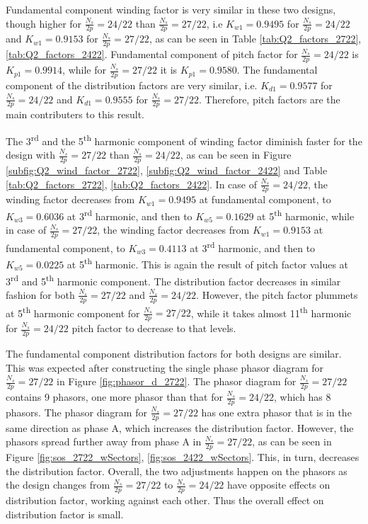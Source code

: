 \documentclass[a4paper, 11pt]{article}
\begin{document}
Fundamental component winding factor is very similar in these two designs, though higher for $\frac{N_s}{2p}=24/22$ than $\frac{N_s}{2p}=27/22$,  i.e $K_{w1} =0.9495$ for $\frac{N_s}{2p}=24/22$ and $K_{w1} =0.9153$ for $\frac{N_s}{2p}=27/22$, as can be seen in Table \ref{tab:Q2_factors_2722}, \ref{tab:Q2_factors_2422}. Fundamental component of pitch factor for $\frac{N_s}{2p}=24/22$ is $K_{p1} =0.9914$, while for $\frac{N_s}{2p}=27/22$ it is $K_{p1} =0.9580$. The fundamental component of the distribution factors are very similar, i.e. $K_{d1} =0.9577$ for $\frac{N_s}{2p}=24/22$ and $K_{d1} =0.9555$ for $\frac{N_s}{2p}=27/22$. Therefore, pitch factors are the main contributers to this result.

The 3\textsuperscript{rd} and the 5\textsuperscript{th} harmonic component of winding factor diminish faster for the design with $\frac{N_s}{2p}=27/22$ than $\frac{N_s}{2p}=24/22$, as can be seen in Figure \ref{subfig:Q2_wind_factor_2722}, \ref{subfig:Q2_wind_factor_2422} and Table \ref{tab:Q2_factors_2722}, \ref{tab:Q2_factors_2422}. In case of $\frac{N_s}{2p}=24/22$, the winding factor decreases from $K_{w1} =0.9495$ at fundamental component, to $K_{w3} =0.6036$ at 3\textsuperscript{rd} harmonic, and then to  $K_{w5} =0.1629$ at 5\textsuperscript{th} harmonic, while in case of $\frac{N_s}{2p}=27/22$, the winding factor decreases from $K_{w1} =0.9153$ at fundamental component, to $K_{w3} =0.4113$ at 3\textsuperscript{rd} harmonic, and then to  $K_{w5} =0.0225$ at 5\textsuperscript{th} harmonic. This is again the result of pitch factor values at 3\textsuperscript{rd} and  5\textsuperscript{th} harmonic component. The distribution factor decreases in similar fashion for both $\frac{N_s}{2p}=27/22$ and $\frac{N_s}{2p}=24/22$. However, the pitch factor plummets at 5\textsuperscript{th} harmonic component for $\frac{N_s}{2p}=27/22$, while it takes almost 11\textsuperscript{th} harmonic for $\frac{N_s}{2p}=24/22$ pitch factor to decrease to that levels.

The fundamental component distribution factors for both designs are similar. This was expected after constructing the single phase phasor diagram for $\frac{N_s}{2p}=27/22$ in Figure \ref{fig:phasor_d_2722}. The phasor diagram for $\frac{N_s}{2p}=27/22$ contains 9 phasors, one more phasor than that for $\frac{N_s}{2p}=24/22$, which has 8 phasors. The phasor diagram for $\frac{N_s}{2p}=27/22$ has one extra phasor that is in the same direction as phase A, which increases the distribution factor. However, the phasors spread further away from phase A in $\frac{N_s}{2p}=27/22$, as can be seen in Figure \ref{fig:sos_2722_wSectors}, \ref{fig:sos_2422_wSectors}. This, in turn, decreases the distribution factor. Overall, the two adjustments happen on the phasors as the design changes from $\frac{N_s}{2p}=27/22$ to $\frac{N_s}{2p}=24/22$ have opposite effects on distribution factor, working against each other. Thus the overall effect on distribution factor is small.
\end{document}

